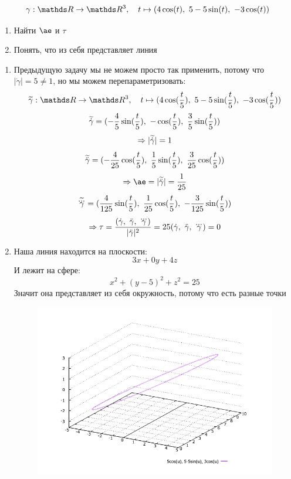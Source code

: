 \documentclass[12pt, fleqn]{article}
\begin{document}
\begin{Example}
  \[\gamma: \R \ra \R^3,\q t \mapsto (4 \cos(t),\ 5-5 \sin(t),\ -3\cos(t))\]
  \begin{enumerate}
    \item Найти $\ae$ и $\tau$
    \item Понять, что из себя представляет линия
  \end{enumerate}
\end{Example}

\begin{sol}
  \begin{enumerate}
    \item Предыдущую задачу мы не можем просто так применить, потому что $|\dot{\gamma}|=5 \neq 1$, но мы можем перепараметризовать:
    \[\w{\gamma}: \R \ra \R^3,\q t \mapsto (4 \cos(\frac{t}{5}),\ 5-5 \sin(\frac{t}{5}),\ -3\cos(\frac{t}{5}))\]
    \[\widetilde{\dot{\gamma}} = (-\frac{4}{5} \sin(\frac{t}{5}),\ -\cos(\frac{t}{5}),\ \frac{3}{5} \sin(\frac{t}{5}))\]
    \[\Rightarrow |\widetilde{\dot{\gamma}}|=1\]
    \[\widetilde{\ddot{\gamma}} = (-\frac{4}{25} \cos(\frac{t}{5}),\ \frac{1}{5} \sin(\frac{t}{5}),\ \frac{3}{25} \cos(\frac{t}{5}))\]
    \[\Ra \ae = |\w{\ddot{\gamma}}| = \frac{1}{25}\]
    \[\widetilde{\overset{{}_{\displaystyle ...}}{\gamma}} = (\frac{4}{125} \sin(\frac{t}{5}),\ \frac{1}{25} \cos(\frac{t}{5}),\ -\frac{3}{125} \sin(\frac{t}{5}))\]
    \[\Ra \tau = \frac{(\dot{\gamma},\ \ddot{\gamma},\ \dddot{\gamma})}{|\ddot{\gamma}|^2}=25 (\dot{\gamma},\ \ddot{\gamma},\ \dddot{\gamma})=0\]
    \item Наша линия находится на плоскости:
    \[3x+0y+4z\]
    И лежит на сфере:
    \[x^2+(y-5)^2+z^2=25\]
    Значит она представляет из себя окружность, потому что есть разные точки
    \begin{figure}[H]
  	    \includegraphics[scale=0.6]{pics/2_2.png}
  	    \centering
  	\end{figure}
  \end{enumerate}
\end{sol}
\end{document}
